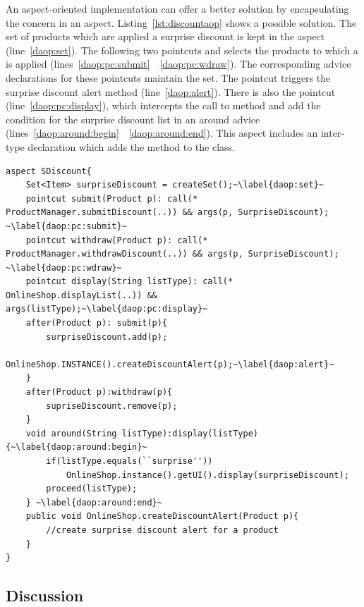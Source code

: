 An aspect-oriented implementation can offer a better solution by encapsulating the concern in an aspect. Listing~\ref{lst:discountaop} shows a possible solution. The set of products which are applied a surprise discount is kept in the aspect (line~\ref{daop:set}). The following two pointcuts  and  selects the products to which a  is applied (lines~\ref{daop:pc:submit}~\textendash~\ref{daop:pc:wdraw}). The corresponding advice declarations for these pointcuts maintain the  set. The  pointcut triggers the surprise discount alert method (line~\ref{daop:alert}). There is also the  pointcut (line~\ref{daop:pc:display}), which intercepts the call to  method and add the condition for the surprise discount list in an around advice (lines~\ref{daop:around:begin}~\textendash~\ref{daop:around:end}). This aspect includes an inter-type declaration which adds the  method to the  class.


\begin{lstlisting}[float=h, caption={An AspectJ implementation of discount alert concern}, label={lst:discountaop}]
aspect SDiscount{
	Set<Item> surpriseDiscount = createSet();~\label{daop:set}~
	pointcut submit(Product p): call(* ProductManager.submitDiscount(..)) && args(p, SurpriseDiscount); ~\label{daop:pc:submit}~
	pointcut withdraw(Product p): call(* ProductManager.withdrawDiscount(..)) && args(p, SurpriseDiscount); ~\label{daop:pc:wdraw}~
	pointcut display(String listType): call(* OnlineShop.displayList(..)) && args(listType);~\label{daop:pc:display}~
	after(Product p): submit(p){
		surpriseDiscount.add(p);
		OnlineShop.INSTANCE().createDiscountAlert(p);~\label{daop:alert}~
	}
	after(Product p):withdraw(p){
		supriseDiscount.remove(p);
	}
	void around(String listType):display(listType){~\label{daop:around:begin}~
		if(listType.equals(``surprise''))
			OnlineShop.instance().getUI().display(surpriseDiscount);
		proceed(listType);
	} ~\label{daop:around:end}~
	public void OnlineShop.createDiscountAlert(Product p){
		//create surprise discount alert for a product
	}
}
\end{lstlisting}

\subsection{Discussion}

